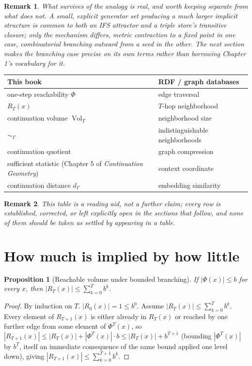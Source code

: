 \documentclass[11pt]{report}
\newtheorem{proposition}{Proposition}[chapter]
\newtheorem{remark}{Remark}[chapter]
\begin{document}
\begin{remark}
What survives of the analogy is real, and worth keeping separate from
what does not. A small, explicit generator set producing a much
larger implicit structure is common to both an IFS attractor and a
triple store's transitive closure; only the mechanism differs, metric
contraction to a fixed point in one case, combinatorial branching
outward from a seed in the other. The next section makes the
branching case precise on its own terms rather than borrowing Chapter
1's vocabulary for it.
\end{remark}

\begin{center}
\begin{tabular}{ll}
\hline
\textbf{This book} & \textbf{RDF / graph databases} \\
\hline
one-step reachability $\Phi$ & edge traversal \\
$R_T(x)$ & $T$-hop neighborhood \\
continuation volume $\operatorname{Vol}_T$ & neighborhood size \\
$\sim_\Gamma$ & indistinguishable neighborhoods \\
continuation quotient & graph compression \\
sufficient statistic (Chapter 5 of \emph{Continuation Geometry}) & context coordinate \\
continuation distance $d_\Gamma$ & embedding similarity \\
\hline
\end{tabular}
\end{center}

\begin{remark}
This table is a reading aid, not a further claim; every row is
established, corrected, or left explicitly open in the sections that
follow, and none of them should be taken as settled by appearing in a
table.
\end{remark}

\section*{How much is implied by how little}

\begin{proposition}[Reachable volume under bounded branching]
\label{prop:volbound}
If $|\Phi(x)| \leq b$ for every $x$, then
$|R_T(x)| \leq \sum_{k=0}^{T} b^k$.
\end{proposition}
\begin{proof}
By induction on $T$. $|R_0(x)| = 1 \leq b^0$. Assume
$|R_T(x)| \leq \sum_{k=0}^T b^k$. Every element of $R_{T+1}(x)$ is
either already in $R_T(x)$ or reached by one further edge from some
element of $\Phi^T(x)$, so
$|R_{T+1}(x)| \leq |R_T(x)| + |\Phi^T(x)| \cdot b \leq |R_T(x)| +
b^{T+1}$ (bounding $|\Phi^T(x)|$ by $b^T$, itself an immediate
consequence of the same bound applied one level down), giving
$|R_{T+1}(x)| \leq \sum_{k=0}^{T+1} b^k$.
\end{proof}
\end{document}
